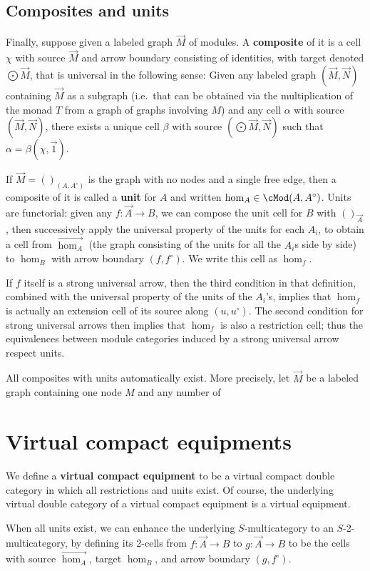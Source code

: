 \documentclass{amsart}
\def\opcart{\chi}
\def\emptyvec#1{()_{#1}}
\def\unit#1{\hom_{#1}}
\def\bigcomp{\textstyle\bigodot\!}
\renewcommand{\o}{^{\circ}}
\let\vec\overrightarrow
\begin{document}
\subsection{Composites and units}
\label{sec:composites}

Finally, suppose given a labeled graph $\vec{M}$ of modules.
A \textbf{composite} of it is a cell $\opcart$ with source $\vec M$ and arrow boundary consisting of identities, with target denoted $\bigcomp\vec{M}$, that is universal in the following sense:
Given any labeled graph $(\vec M,\vec N)$ containing $\vec{M}$ as a subgraph (i.e.\ that can be obtained via the multiplication of the monad $T$ from a graph of graphs involving $M$) and any cell $\alpha$ with source $(\vec M,\vec N)$, there exists a unique cell $\beta$ with source $(\bigcomp\vec{M},\vec N)$ such that $\alpha = \beta(\opcart,\vec 1)$.

If $\vec M = \emptyvec{(A,A\o)}$ is the graph with no nodes and a single free edge, then a composite of it is called a \textbf{unit} for $A$ and written $\unit A \in \cMod(A,A\o)$.
Units are functorial: given any $f:\vec{A} \to B$, we can compose the unit cell for $B$ with $\emptyvec{\vec{A}}$, then successively apply the universal property of the units for each $A_i$, to obtain a cell from $\vec{\unit A}$ (the graph consisting of the units for all the $A_i$s side by side) to $\unit B$ with arrow boundary $(f,f\o)$.
We write this cell as $\unit f$.

If $f$ itself is a strong universal arrow, then the third condition in that definition, combined with the universal property of the units of the $A_i$'s, implies that $\unit f$ is actually an extension cell of its source along $(u,u\o)$.
The second condition for strong universal arrows then implies that $\unit f$ is also a restriction cell; thus the equivalences between module categories induced by a strong universal arrow respect units.

All composites with units automatically exist.
More precisely, let $\vec M$ be a labeled graph containing one node $M$ and any number of 


\section{Virtual compact equipments}
\label{sec:virt-compact-equipm}

We define a \textbf{virtual compact equipment} to be a virtual compact double category in which all restrictions and units exist.
Of course, the underlying virtual double category of a virtual compact equipment is a virtual equipment.

When all units exist, we can enhance the underlying $S$-multicategory to an $S$-2-multicategory, by defining its 2-cells from $f:\vec A \to B$ to $g:\vec A \to B$ to be the cells with source $\vec{\unit A}$, target $\unit B$, and arrow boundary $(g,f\o)$.
\end{document}
